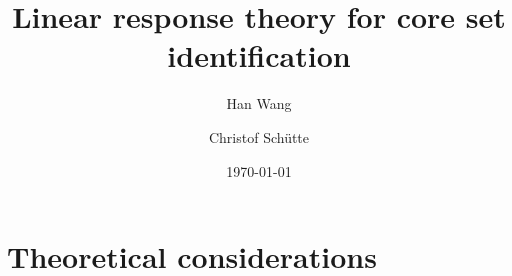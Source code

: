 \documentclass[aip,jcp,a4paper,reprint,onecolumn]{revtex4-1}
\begin{document}
\title{Linear response theory for core set identification}
\author{Han Wang}
\author{Christof Sch\"utte}

\date{\today}

\begin{abstract}
\end{abstract}

\maketitle

\section{Theoretical considerations}
\end{document}
